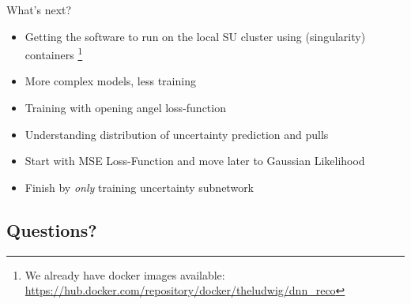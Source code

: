 \begin{frame}{What's next?}
    \begin{itemize}
        \item Getting the software to run on the local SU cluster using (singularity) containers
              \footnote{We already have docker images available: \tiny\url{https://hub.docker.com/repository/docker/theludwig/dnn_reco}}
        \item More complex models, less training
        \item Training with opening angel loss-function
        \item Understanding distribution of uncertainty prediction and pulls
        \item Start with MSE Loss-Function and move later to Gaussian Likelihood
        \item Finish by \emph{only} training uncertainty subnetwork
    \end{itemize}
\end{frame}
\begin{frame}

    \section*{Questions?}

\end{frame}